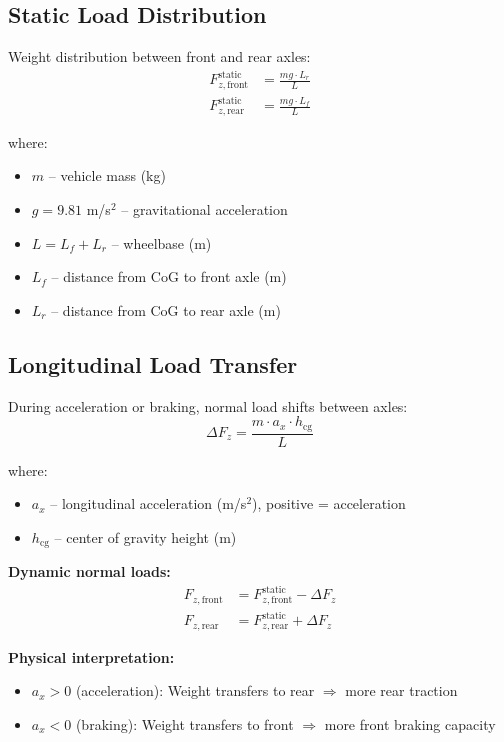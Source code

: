 \documentclass[11pt,a4paper]{article}
\begin{document}
\subsection{Static Load Distribution}

Weight distribution between front and rear axles:
\begin{align}
F_{z,\text{front}}^{\text{static}} &= \frac{mg \cdot L_r}{L} \\
F_{z,\text{rear}}^{\text{static}} &= \frac{mg \cdot L_f}{L}
\end{align}

where:
\begin{itemize}
    \item $m$ -- vehicle mass (kg)
    \item $g = 9.81$ m/s$^2$ -- gravitational acceleration
    \item $L = L_f + L_r$ -- wheelbase (m)
    \item $L_f$ -- distance from CoG to front axle (m)
    \item $L_r$ -- distance from CoG to rear axle (m)
\end{itemize}

\subsection{Longitudinal Load Transfer}

During acceleration or braking, normal load shifts between axles:
\begin{equation}
\boxed{\Delta F_z = \frac{m \cdot a_x \cdot h_{\text{cg}}}{L}}
\end{equation}

where:
\begin{itemize}
    \item $a_x$ -- longitudinal acceleration (m/s$^2$), positive = acceleration
    \item $h_{\text{cg}}$ -- center of gravity height (m)
\end{itemize}

\textbf{Dynamic normal loads:}
\begin{align}
F_{z,\text{front}} &= F_{z,\text{front}}^{\text{static}} - \Delta F_z \\
F_{z,\text{rear}} &= F_{z,\text{rear}}^{\text{static}} + \Delta F_z
\end{align}

\textbf{Physical interpretation:}
\begin{itemize}
    \item $a_x > 0$ (acceleration): Weight transfers to rear $\Rightarrow$ more rear traction
    \item $a_x < 0$ (braking): Weight transfers to front $\Rightarrow$ more front braking capacity
\end{itemize}
\end{document}
